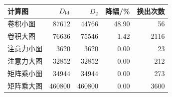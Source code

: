 {\setlength{\tabcolsep}{12pt}\begin{tabular}{lrrrr}\toprule
计算图 & $D_{\rm id}$ & $D_2$ & 降幅/\% & 换出次数\\\midrule
卷积小图 & 87612 & 44766 & 48.90 & 56\\
卷积大图 & 76636 & 75546 & 1.42 & 2116\\
注意力小图 & 3620 & 3620 & 0.00 & 23\\
注意力大图 & 32852 & 32852 & 0.00 & 212\\
矩阵乘小图 & 34944 & 34944 & 0.00 & 273\\
矩阵乘大图 & 460800 & 460800 & 0.00 & 3600\\
\bottomrule\end{tabular}}
